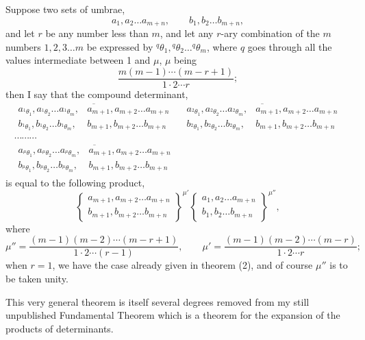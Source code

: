 \documentclass[11pt]{article}
\newcommand{\bd}[2]{\left\{\begin{matrix}#1\\#2\end{matrix}\right\}}
\begin{document}
{{Suppose two sets of umbrae,
\[
 a_1,a_2\ldots a_{m+n},\qquad b_1,b_2\ldots b_{m+n},
\]
and let $r$ be any number less than $m$, and let any $r$-ary combination of the $m$ numbers $1,2,3\ldots m$ be expressed by ${}^{q}\theta_1,{}^{q}\theta_2\ldots{}^{q}\theta_m$, where $q$ goes through all the values intermediate between 1 and $\mu$, $\mu$ being
\[
\frac{m(m-1)\cdots(m-r+1)}{1\cdot2\cdots r};
\]
then I say that the compound determinant,
\[
\begin{gathered}
\overline{\begin{matrix}a_{{}^{1}\theta_1},a_{{}^{1}\theta_2}\ldots a_{{}^{1}\theta_m},&a_{m+1},a_{m+2}\ldots a_{m+n}\\
b_{{}^{1}\theta_1},b_{{}^{1}\theta_2}\ldots b_{{}^{1}\theta_m},&b_{m+1},b_{m+2}\ldots b_{m+n}
\end{matrix}}\quad
\overline{\begin{matrix}a_{{}^{2}\theta_1},a_{{}^{2}\theta_2}\ldots a_{{}^{2}\theta_m},&a_{m+1},a_{m+2}\ldots a_{m+n}\\
b_{{}^{2}\theta_1},b_{{}^{2}\theta_2}\ldots b_{{}^{2}\theta_m},&b_{m+1},b_{m+2}\ldots b_{m+n}
\end{matrix}}\\
\cdots\cdots\cdots\\
\overline{\begin{matrix}a_{{}^{\mu}\theta_1},a_{{}^{\mu}\theta_2}\ldots a_{{}^{\mu}\theta_m},&a_{m+1},a_{m+2}\ldots a_{m+n}\\
b_{{}^{\mu}\theta_1},b_{{}^{\mu}\theta_2}\ldots b_{{}^{\mu}\theta_m},&b_{m+1},b_{m+2}\ldots b_{m+n}
\end{matrix}}
\end{gathered}
\]
is equal to the following product,
\[
\bd{a_{m+1},a_{m+2}\ldots a_{m+n}}{b_{m+1},b_{m+2}\ldots b_{m+n}}^{\mu'}
\bd{a_1,a_2\ldots a_{m+n}}{b_1,b_2\ldots b_{m+n}}^{\mu''},\tag{4}
\]
where
\[
\mu''=\frac{(m-1)(m-2)\cdots(m-r+1)}{1\cdot2\cdots(r-1)},
\qquad
\mu'=\frac{(m-1)(m-2)\cdots(m-r)}{1\cdot2\cdots r};
\]
when $r=1$, we have the case already given in theorem (2), and of course $\mu''$ is to be taken unity.

This very general theorem is itself several degrees removed from my still unpublished Fundamental Theorem which is a theorem for the expansion of the products of determinants.

}}
\end{document}
